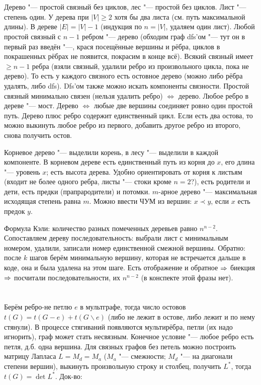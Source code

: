 \section{} %
Дерево "--- простой связный без циклов, лес "--- простой без циклов.
Лист "--- степень один.
У дерева при $|V|\ge 2$ хотя бы два листа (см. путь максимальной длины).
В дереве $|E|=|V|-1$ (индукция по $n=|V|$, удаляем один лист).
Любой простой связный с $n-1$ ребром "--- дерево (обходим граф dfs'ом "--- тут он в первый раз введён "---, крася посещённые вершины и рёбра, циклов в покрашенных
рёбрах не появится, покрасим в конце всё).
Всякий связный имеет $\ge n-1$ ребра (взяли связный, удалили ребро из произвольного цикла, пока не дерево).
То есть у каждого связного есть остовное дерево (можно либо рёбра удалять, либо dfs).
Dfs'ом также можно искать компоненты связности.
Простой связный минимально связен (нельзя удалить ребро) $\iff$ дерево.
Любое ребро в дереве "--- мост.
Дерево $\iff$ любые две вершины соединяет ровно один простой путь.
Дерево плюс ребро содержит единственный цикл.
Если есть два остова, то можно выкинуть любое ребро из первого, добавить другое ребро из второго, снова получить остов.

Корневое дерево "--- выделили корень, в лесу "--- выделили в каждой компоненте.
В корневом дереве есть единственный путь из корня до $x$, его длина "--- уровень $x$;
есть высота дерева.
Удобно ориентировать от корня к листьям (входит не более одного ребра, листы "--- стоки \TODO кроме $n=2$?),
есть родители и дети, есть предки (прапрародители) и потомки.
$m$-арное дерево "--- максимальная исходящая степень равна $m$.
Можно ввести ЧУМ из вершин: $x \prec y$, если $x$ есть предок $y$.

Формула Кэли: количество разных помеченных деревьев равно $n^{n-2}$.
Сопоставляем дереву последовательность: выбрали лист с минимальным номером, удалили,
записали номер единственной смежной вершины.
Обратно: после $k$ шагов берём минимальную вершину, которая не встречается дальше в коде, она и была
удалена на этом шаге.
Есть отображение и обратное $\Rightarrow$ биекция $\Rightarrow$ посчитали последовательности, их $n^{n-2}$ (\TODO в конспекте этой фразы нет).

\section{} %
Берём ребро-не петлю $e$ в мультграфе, тогда число остовов $t(G)=t(G-e)+t(G\backslash e)$ (либо не лежит в остове, либо лежит и по нему стянули).
В процессе стягиваний появляются мультирёбра, петли (их надо игнорить), граф может стать несвязным.
Конечное условие "--- любое ребро есть петля, д.б. одна вершина.
Для связных графов без петель можно построить матрицу Лапласа $L=M_d=M_a$ ($M_a$ "--- смежности; $M_d$ "--- на диагонали степени вершин),
выкинуть произвольную строку и столбец, получить $L^*$, тогда $t(G)=\det L^*$.
Док-во:


